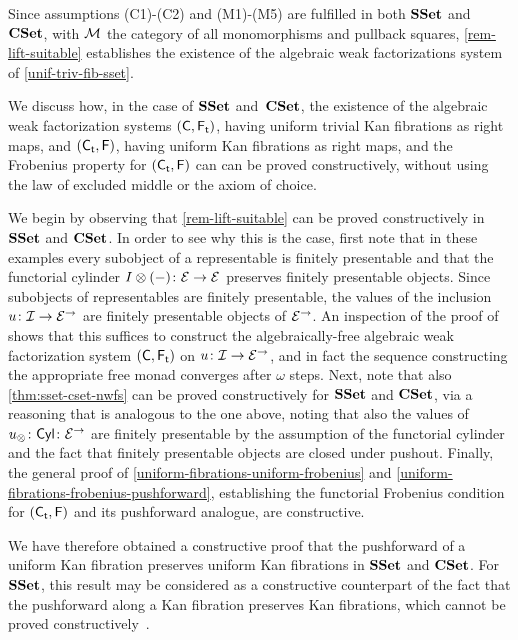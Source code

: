 \documentclass[reqno,10pt,a4paper,oneside,draft]{amsart}
\begin{document}
{{\begin{remark} \label{justify-sset-cset-examples}
Since assumptions (C1)-(C2) and (M1)-(M5) are fulfilled in both $\SSet$ and~$\CSet$, with $\cal{M}$ the category of all monomorphisms and pullback squares, \cref{rem-lift-suitable} establishes 
the existence of  the algebraic weak factorizations system  of  \cref{unif-triv-fib-sset}. 
\end{remark}


\begin{remark} \label{rem:constructive-small-object}  We discuss how, in the case of $\SSet$ and~$\CSet$, the existence of the algebraic weak factorization systems $(\CC, \TF)$,
having uniform trivial Kan fibrations as right maps,  and $(\TC, \FF)$, having uniform Kan fibrations as right maps, and the Frobenius property for $(\TC, \FF)$  can can be proved constructively, \ie without using the law of excluded middle or the axiom of choice.

We begin by observing that \cref{rem-lift-suitable} can be proved constructively in $\SSet$ and $\CSet$. 
In order to see why this is the case, first note that in these examples every subobject of a representable is finitely presentable and that the functorial cylinder $\interval \otimes (-) \co \cal{E} \to \cal{E}$ preserves finitely presentable objects.
Since subobjects of representables are finitely presentable, the values of the inclusion $u \co \cal{I} \to \cal{E}^\to$ are finitely presentable objects of $\cal{E}^\to$.
An inspection of the proof of \cite[Theorem~4.4]{garner:small-object-argument} shows that this suffices to construct the algebraically-free algebraic weak factorization system $(\CC, \TF)$ on $u \co \cal{I} \to \cal{E}^\to$, and in fact the sequence constructing the appropriate free monad converges after $\omega$ steps. 
Next, note that also \cref{thm:sset-cset-nwfs} can be proved constructively for $\SSet$ and $\CSet$, via a reasoning that is analogous to the one above, noting that also the values of $u_\otimes \co \Cyl \co \cal{E}^\to$ are finitely presentable by the assumption of the functorial cylinder and the fact that finitely presentable objects are closed under pushout. Finally, the general proof of
\cref{uniform-fibrations-uniform-frobenius} and  \cref{uniform-fibrations-frobenius-pushforward}, establishing the functorial Frobenius condition for  $(\TC, \FF)$ and its pushforward analogue, are constructive. 

We have therefore obtained a constructive proof that the pushforward of a uniform Kan fibration preserves uniform Kan fibrations in $\SSet$ and $\CSet$. For $\SSet$,  this
result may be considered as a constructive counterpart of the fact that the pushforward along a Kan fibration preserves Kan fibrations, which cannot be proved constructively~\cite{coquand-non-constructivity-kan}. 


\end{remark}}}
\end{document}

